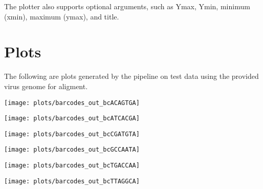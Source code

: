 \documentclass[10pt,a4paper]{article}
\begin{document}
The plotter also supports optional arguments, such as Ymax, Ymin, minimum (xmin), maximum (ymax), and title.


\section{Plots}
The following are plots generated by the pipeline on test data using the provided virus genome for aligment.

\texttt{[image: plots/barcodes\_out\_bcACAGTGA]}

\texttt{[image: plots/barcodes\_out\_bcATCACGA]}

\texttt{[image: plots/barcodes\_out\_bcCGATGTA]}

\texttt{[image: plots/barcodes\_out\_bcGCCAATA]}

\texttt{[image: plots/barcodes\_out\_bcTGACCAA]}

\texttt{[image: plots/barcodes\_out\_bcTTAGGCA]}
\end{document}

